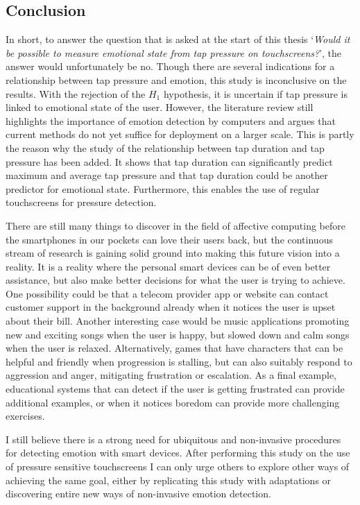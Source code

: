 \documentclass{sigchi}
\begin{document}
\subsection{Conclusion} %
\label{sub:conclusion}
In short, to answer the question that is asked at the start of this thesis `\textit{Would it be possible to measure emotional state from tap pressure on touchscreens?}', the answer would unfortunately be no. Though there are several indications for a relationship between tap pressure and emotion, this study is inconclusive on the results. With the rejection of the $H_1$ hypothesis, it is uncertain if tap pressure is linked to emotional state of the user. However, the literature review still highlights the importance of emotion detection by computers and argues that current methods do not yet suffice for deployment on a larger scale. This is partly the reason why the study of the relationship between tap duration and tap pressure has been added. It shows that tap duration can significantly predict maximum and average tap pressure and that tap duration could be another predictor for emotional state. Furthermore, this enables the use of regular touchscreens for pressure detection.

There are still many things to discover in the field of affective computing before the smartphones in our pockets can love their users back, but the continuous stream of research is gaining solid ground into making this future vision into a reality. It is a reality where the personal smart devices can be of even better assistance, but also make better decisions for what the user is trying to achieve. One possibility could be that a telecom provider app or website can contact customer support in the background already when it notices the user is upset about their bill. Another interesting case would be music applications promoting new and exciting songs when the user is happy, but slowed down and calm songs when the user is relaxed. Alternatively, games that have characters that can be helpful and friendly when progression is stalling, but can also suitably respond to aggression and anger, mitigating frustration or escalation. As a final example, educational systems that can detect if the user is getting frustrated can provide additional examples, or when it notices boredom can provide more challenging exercises.

I still believe there is a strong need for ubiquitous and non-invasive procedures for detecting emotion with smart devices. After performing this study on the use of pressure sensitive touchscreens I can only urge others to explore other ways of achieving the same goal, either by replicating this study with adaptations or discovering entire new ways of non-invasive emotion detection.
\end{document}
